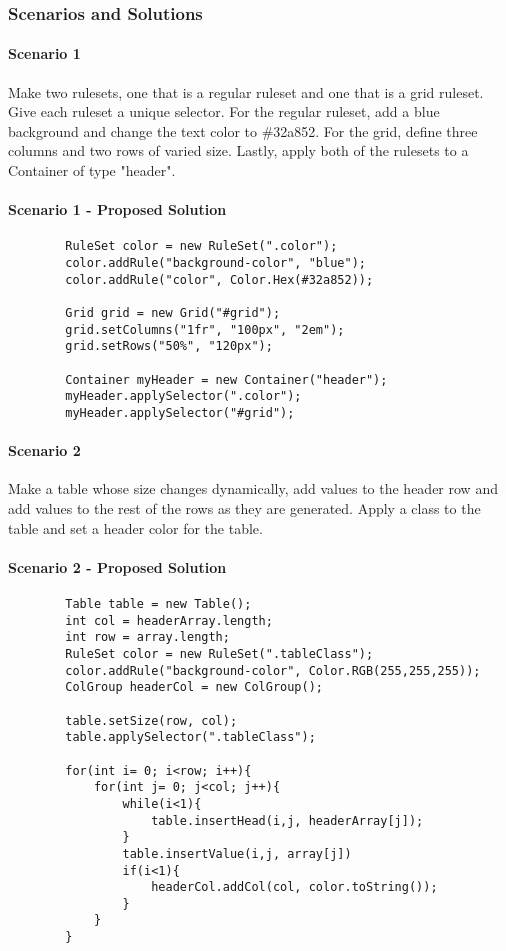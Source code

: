 \documentclass[12pt]{article}
\begin{document}
    \subsubsection{Scenarios and Solutions}

    \paragraph{Scenario 1}
    Make two rulesets, one that is a regular ruleset and one that is a grid ruleset. Give each ruleset a unique selector. For the regular ruleset, add a blue background and change the text color to \#32a852. For the grid, define three columns and two rows of varied size. Lastly, apply both of the rulesets to a Container of type "header".

    \paragraph{Scenario 1 - Proposed Solution}

    \begin{lstlisting}
        RuleSet color = new RuleSet(".color");
        color.addRule("background-color", "blue");
        color.addRule("color", Color.Hex(#32a852));

        Grid grid = new Grid("#grid");
        grid.setColumns("1fr", "100px", "2em");
        grid.setRows("50%", "120px");

        Container myHeader = new Container("header");
        myHeader.applySelector(".color");
        myHeader.applySelector("#grid");
    \end{lstlisting}


    \paragraph{Scenario 2}
    Make a table whose size changes dynamically, add values to the header row and add values to the rest of the rows as they are generated. Apply a class to the table and set a header color for the table.


    \paragraph{Scenario 2 - Proposed Solution}

    \begin{lstlisting}
        Table table = new Table();
        int col = headerArray.length;
        int row = array.length;
        RuleSet color = new RuleSet(".tableClass");
        color.addRule("background-color", Color.RGB(255,255,255));
        ColGroup headerCol = new ColGroup();

        table.setSize(row, col);
        table.applySelector(".tableClass");

        for(int i= 0; i<row; i++){
            for(int j= 0; j<col; j++){
                while(i<1){
                    table.insertHead(i,j, headerArray[j]);
                }
                table.insertValue(i,j, array[j])
                if(i<1){
                    headerCol.addCol(col, color.toString());
                }
            }
        }
    \end{lstlisting}
\end{document}
